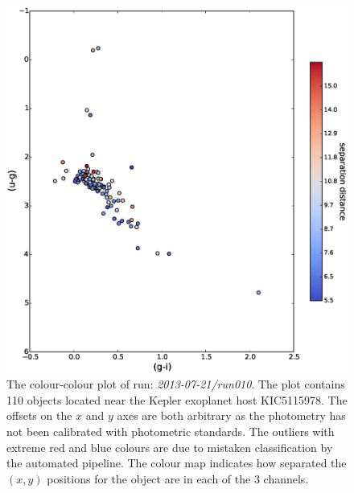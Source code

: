 \begin{figure}
\centering
\includegraphics[width=140mm]{images/2013-07-21-run010-2colour.eps}
\caption{The colour-colour plot of run: \emph{2013-07-21/run010}. The plot contains 110 objects located near the Kepler exoplanet host KIC5115978. The offsets on the $x$ and $y$ axes are both arbitrary as the photometry has not been calibrated with photometric standards. The outliers with extreme red and blue colours are due to mistaken classification by the automated pipeline. The colour map indicates how separated the $(x, y)$ positions for the object are in each of the 3 channels.}
\label{fig:run010-2colour}
\end{figure}

